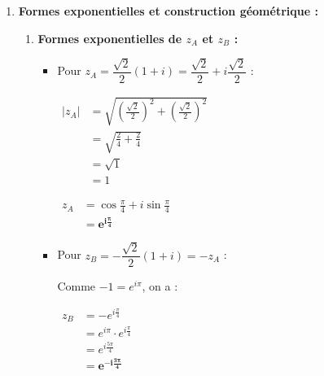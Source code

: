 \documentclass[12pt,a4paper]{article}
\begin{document}
\begin{enumerate}
\begin{enumerate}
        $
        \mathcal{S} = \left\{\mathbf{-1 \,;\, \dfrac{\sqrt{2}}{2} + i\dfrac{\sqrt{2}}{2} \,;\, -\dfrac{\sqrt{2}}{2} - i\dfrac{\sqrt{2}}{2}}\right\}
        $
    \end{enumerate}

    \item \textbf{Formes exponentielles et construction géométrique :}
    
    \begin{enumerate}
        \item \textbf{Formes exponentielles de $z_A$ et $z_B$ :}
        
        \begin{itemize}
            \item Pour $z_A = \dfrac{\sqrt{2}}{2}(1 + i) = \dfrac{\sqrt{2}}{2} + i\dfrac{\sqrt{2}}{2}$ :
            
            $
            \begin{aligned}
                |z_A| &= \sqrt{\left(\frac{\sqrt{2}}{2}\right)^2 + \left(\frac{\sqrt{2}}{2}\right)^2}\\
                &= \sqrt{\frac{2}{4} + \frac{2}{4}}\\
                &= \sqrt{1}\\
                &= 1
            \end{aligned}
            $
            
            $
            \begin{aligned}
                z_A &= \cos\frac{\pi}{4} + i\sin\frac{\pi}{4}\\
                &= \mathbf{e^{i\frac{\pi}{4}}}
            \end{aligned}
            $
            
            \item Pour $z_B = -\dfrac{\sqrt{2}}{2}(1 + i) = -z_A$ :
            
            Comme $-1 = e^{i\pi}$, on a :
            
            $
            \begin{aligned}
                z_B &= -e^{i\frac{\pi}{4}}\\
                &= e^{i\pi} \cdot e^{i\frac{\pi}{4}}\\
                &= e^{i\frac{5\pi}{4}}\\
                &= \mathbf{e^{-i\frac{3\pi}{4}}}
            \end{aligned}
            $
        \end{itemize}


\end{enumerate}
\end{enumerate}
\end{document}
